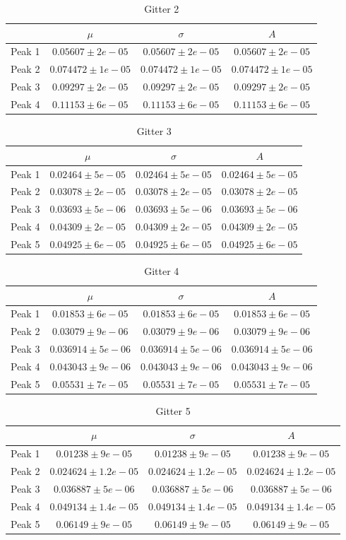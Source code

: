 \documentclass[12pt]{article}
\begin{document}
\begin{table}[h!]
	\centering
	\begin{tabular}{l|c|c|c}
		&$\mu$&$\sigma$&$A$\\\hline
		Peak 1&$0.05607\pm2e-05$&$0.05607\pm2e-05$&$0.05607\pm2e-05$\\
		Peak 2&$0.074472\pm1e-05$&$0.074472\pm1e-05$&$0.074472\pm1e-05$\\
		Peak 3&$0.09297\pm2e-05$&$0.09297\pm2e-05$&$0.09297\pm2e-05$\\
		Peak 4&$0.11153\pm6e-05$&$0.11153\pm6e-05$&$0.11153\pm6e-05$\\
	\end{tabular}
	\caption{Gitter 2}
\end{table}
\begin{table}[h!]
	\centering
	\begin{tabular}{l|c|c|c}
		&$\mu$&$\sigma$&$A$\\\hline
		Peak 1&$0.02464\pm5e-05$&$0.02464\pm5e-05$&$0.02464\pm5e-05$\\
		Peak 2&$0.03078\pm2e-05$&$0.03078\pm2e-05$&$0.03078\pm2e-05$\\
		Peak 3&$0.03693\pm5e-06$&$0.03693\pm5e-06$&$0.03693\pm5e-06$\\
		Peak 4&$0.04309\pm2e-05$&$0.04309\pm2e-05$&$0.04309\pm2e-05$\\
		Peak 5&$0.04925\pm6e-05$&$0.04925\pm6e-05$&$0.04925\pm6e-05$\\
	\end{tabular}
	\caption{Gitter 3}
\end{table}
\begin{table}[h!]
	\centering
	\begin{tabular}{l|c|c|c}
		&$\mu$&$\sigma$&$A$\\\hline
		Peak 1&$0.01853\pm6e-05$&$0.01853\pm6e-05$&$0.01853\pm6e-05$\\
		Peak 2&$0.03079\pm9e-06$&$0.03079\pm9e-06$&$0.03079\pm9e-06$\\
		Peak 3&$0.036914\pm5e-06$&$0.036914\pm5e-06$&$0.036914\pm5e-06$\\
		Peak 4&$0.043043\pm9e-06$&$0.043043\pm9e-06$&$0.043043\pm9e-06$\\
		Peak 5&$0.05531\pm7e-05$&$0.05531\pm7e-05$&$0.05531\pm7e-05$\\
	\end{tabular}
	\caption{Gitter 4}
\end{table}
\begin{table}[h!]
	\centering
	\begin{tabular}{l|c|c|c}
		&$\mu$&$\sigma$&$A$\\\hline
		Peak 1&$0.01238\pm9e-05$&$0.01238\pm9e-05$&$0.01238\pm9e-05$\\
		Peak 2&$0.024624\pm1.2e-05$&$0.024624\pm1.2e-05$&$0.024624\pm1.2e-05$\\
		Peak 3&$0.036887\pm5e-06$&$0.036887\pm5e-06$&$0.036887\pm5e-06$\\
		Peak 4&$0.049134\pm1.4e-05$&$0.049134\pm1.4e-05$&$0.049134\pm1.4e-05$\\
		Peak 5&$0.06149\pm9e-05$&$0.06149\pm9e-05$&$0.06149\pm9e-05$\\
	\end{tabular}
	\caption{Gitter 5}
\end{table}
\end{document}
